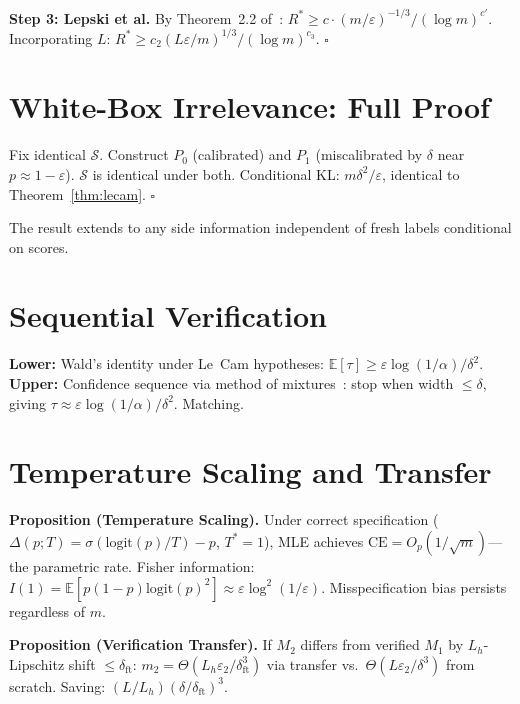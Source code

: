 \documentclass{article}
\newcommand{\CE}{\mathrm{CE}}
\newcommand{\cS}{\mathcal{S}}
\newcommand{\Lip}{L}
\newcommand{\errrate}{\varepsilon}
\newcommand{\nsamples}{m}
\newcommand{\calmap}{\Delta}
\providecommand{\E}{}
\renewcommand{\E}{\mathbb{E}}
\newcommand{\logit}{\mathrm{logit}}
\providecommand{\sigmoid}{}
\renewcommand{\sigmoid}{\sigma}
\newcommand{\ftshift}{\delta_{\mathrm{ft}}}
\newcommand{\Liph}{L_h}
\newcommand{\stoppingtime}{\tau}
\newcommand{\targetacc}{\delta}
\newcommand{\confalpha}{\alpha}
\theoremstyle{definition}
\begin{document}
\textbf{Step 3: Lepski et al.}
By Theorem~2.2 of~\citet{lepski1999estimation}: $R^* \geq c \cdot (\nsamples/\errrate)^{-1/3}/(\log\nsamples)^{c'}$. Incorporating $\Lip$: $R^* \geq c_2(\Lip\errrate/\nsamples)^{1/3}/(\log\nsamples)^{c_3}$. $\square$

\section{White-Box Irrelevance: Full Proof}
\label{app:whitebox}

Fix identical $\cS$. Construct $P_0$ (calibrated) and $P_1$ (miscalibrated by $\targetacc$ near $p \approx 1{-}\errrate$). $\cS$ is identical under both. Conditional KL: $\nsamples\targetacc^2/\errrate$, identical to Theorem~\ref{thm:lecam}. $\square$

The result extends to any side information independent of fresh labels conditional on scores.

\section{Sequential Verification}
\label{app:sequential}

\textbf{Lower:} Wald's identity under Le~Cam hypotheses: $\E[\stoppingtime] \geq \errrate\log(1/\confalpha)/\targetacc^2$. \textbf{Upper:} Confidence sequence via method of mixtures~\citep{howard2021timeuniform}: stop when width $\leq \targetacc$, giving $\stoppingtime \approx \errrate\log(1/\confalpha)/\targetacc^2$. Matching.

\section{Temperature Scaling and Transfer}
\label{app:tempscaling}

\textbf{Proposition (Temperature Scaling).} Under correct specification ($\calmap(p;T) = \sigmoid(\logit(p)/T) - p$, $T^*{=}1$), MLE achieves $\CE = O_p(1/\sqrt{\nsamples})$---the parametric rate. Fisher information: $I(1) = \E[p(1{-}p)\logit(p)^2] \approx \errrate\log^2(1/\errrate)$. Misspecification bias persists regardless of $\nsamples$.

\textbf{Proposition (Verification Transfer).} If $M_2$ differs from verified $M_1$ by $\Liph$-Lipschitz shift $\leq \ftshift$: $\nsamples_2 = \Theta(\Liph\errrate_2/\ftshift^3)$ via transfer vs.\ $\Theta(\Lip\errrate_2/\targetacc^3)$ from scratch. Saving: $(\Lip/\Liph)(\targetacc/\ftshift)^3$.
\end{document}
